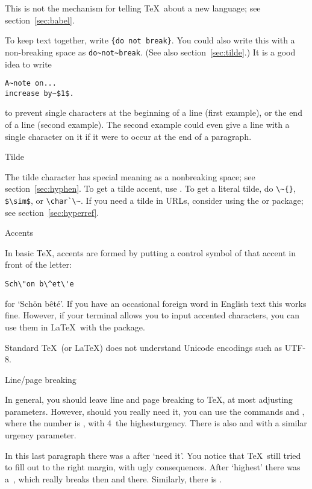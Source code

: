 This is not the mechanism for telling \TeX\ about a new language; see
section~\ref{sec:babel}.

To keep text together, write \verb+{do not break}+. You could
also write this with a non-breaking space
as \verb+do~not~break+. (See also
section~\ref{sec:tilde}.) It is a good idea to write
\begin{verbatim}
A~note on...
increase by~$1$.
\end{verbatim}
to prevent single characters at the beginning of a line (first example), or
the end of a line (second example). The second example could
even give a line with a single character on it if it were to occur at
the end of a paragraph.

 {Tilde}
\label{sec:tilde}

The tilde character has special meaning as a nonbreaking space; see
section~\ref{sec:hyphen}. To get a tilde accent, use . To
get a literal tilde, do \verb+\~{}+, \verb+$\sim$+, or
\verb+\char`\~+. If you need a tilde in URLs, consider using the
 or  package; see section~\ref{sec:hyperref}.

 {Accents}

In basic \TeX, accents are formed by putting a control symbol of that accent in
front of the letter:
\begin{verbatim}
Sch\"on b\^et\'e
\end{verbatim}
for `Sch\"on b\^et\'e'. If you have an occasional foreign word in
English text this works fine. However, if your terminal allows you to
input accented characters, you can use them in \LaTeX\ with the
 package.

Standard \TeX\ (or \LaTeX) does not understand Unicode encodings such
as UTF-8.

\pagebreak[3]
 {Line/page breaking}

In general, you should leave line and page breaking to \TeX, at most
adjusting parameters. However, should you really need it,\linebreak
you can use the commands
\discretionary{}{}{}\n{[<num>]} and
\discretionary{}{}{}\n{[<num>]}, where the number
is , with 4~the highest\newline urgency. There is also
 and  with a similar urgency
parameter.

In this last paragraph there was a  after
`need it'. You notice that \TeX\ still tried to fill out to the right
margin, with ugly consequences. After `highest' there was
a~, which really breaks then and there.
Similarly, there is .

